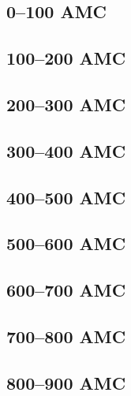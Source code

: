 \documentclass[a4paper,11pt,article,oneside]{memoir}
\begin{document}
\subsection{0--100 AMC}



\subsection{100--200 AMC}



\subsection{200--300 AMC}



\subsection{300--400 AMC}



\subsection{400--500 AMC}



\subsection{500--600 AMC}



\subsection{600--700 AMC}



\subsection{700--800 AMC}



\subsection{800--900 AMC}
\end{document}
